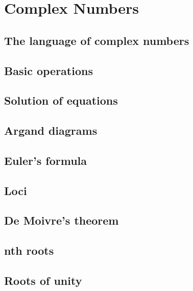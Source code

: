 \chapter{Complex Numbers}
\section{The language of complex numbers}
\section{Basic operations}
\section{Solution of equations}
\section{Argand diagrams}
\section{Euler’s formula}
\section{Loci}
\section{De Moivre’s theorem}
\section{nth roots}
\section{Roots of unity}